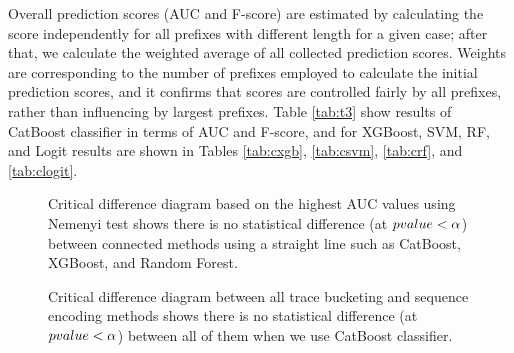 Overall prediction scores (AUC and F-score) are estimated by calculating the score independently for all prefixes with different length for a given case; after that, we calculate the weighted average of all collected prediction scores.  Weights are corresponding to the number of prefixes employed to calculate the initial prediction scores, and it confirms that scores are controlled fairly by all prefixes, rather than influencing by largest prefixes. Table \ref{tab:t3} show results of CatBoost classifier in terms of AUC and F-score, and for XGBoost, SVM, RF, and Logit results are shown in Tables  \ref{tab:cxgb}, \ref{tab:csvm}, \ref{tab:crf}, and \ref{tab:clogit}. 
\begin{figure}[!htb]
	\begin{center}
		\caption[Comparison of all classification algorithms using the Nemenyi test]{Critical difference diagram based on the highest AUC values using Nemenyi test shows there is no statistical difference (at $p\-value < \alpha$) between connected methods using a straight line such as CatBoost, XGBoost, and Random Forest.}
		\label{fig:catn}
	\end{center}
\end{figure}


\begin{figure}[!htb]
	\begin{center}
		\caption[Comparison of all bucketing and encoding methods with CatBoost]{
			Critical difference diagram between all trace bucketing and sequence encoding methods shows there is no statistical difference (at $p\-value < \alpha$) between all of them when we use CatBoost classifier.}
		\label{fig:cat3}
	\end{center}
\end{figure}


